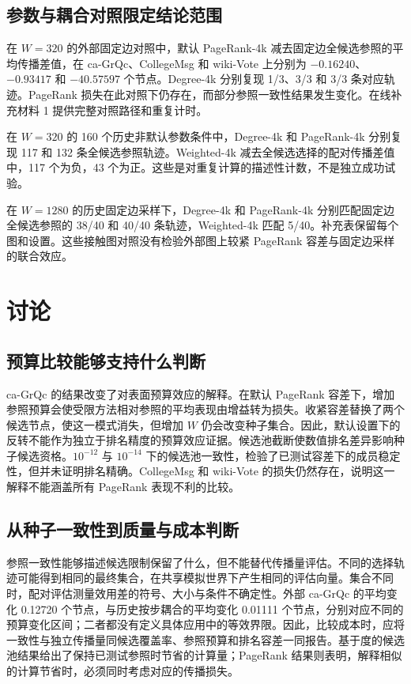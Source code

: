 \documentclass[smallextended]{svjour3}
\begin{document}
\subsection{参数与耦合对照限定结论范围}

在 $W=320$ 的外部固定边对照中，默认 PageRank-4k 减去固定边全候选参照的平均传播差值，在 ca-GrQc、CollegeMsg 和 wiki-Vote 上分别为 $-0.16240$、$-0.93417$ 和 $-40.57597$ 个节点。Degree-4k 分别复现 1/3、3/3 和 3/3 条对应轨迹。PageRank 损失在此对照下仍存在，而部分参照一致性结果发生变化。在线补充材料 1 提供完整对照路径和重复计时。

在 $W=320$ 的 160 个历史非默认参数条件中，Degree-4k 和 PageRank-4k 分别复现 117 和 132 条全候选参照轨迹。Weighted-4k 减去全候选选择的配对传播差值中，117 个为负，43 个为正。这些是对重复计算的描述性计数，不是独立成功试验。

在 $W=1280$ 的历史固定边采样下，Degree-4k 和 PageRank-4k 分别匹配固定边全候选参照的 38/40 和 40/40 条轨迹，Weighted-4k 匹配 5/40。补充表保留每个图和设置。这些接触图对照没有检验外部图上较紧 PageRank 容差与固定边采样的联合效应。
\FloatBarrier

\section{讨论}
\subsection{预算比较能够支持什么判断}
ca-GrQc 的结果改变了对表面预算效应的解释。在默认 PageRank 容差下，增加参照预算会使受限方法相对参照的平均表现由增益转为损失。收紧容差替换了两个候选节点，使这一模式消失，但增加 $W$ 仍会改变种子集合。因此，默认设置下的反转不能作为独立于排名精度的预算效应证据。候选池截断使数值排名差异影响种子候选资格。$10^{-12}$ 与 $10^{-14}$ 下的候选池一致性，检验了已测试容差下的成员稳定性，但并未证明排名精确。CollegeMsg 和 wiki-Vote 的损失仍然存在，说明这一解释不能涵盖所有 PageRank 表现不利的比较。

\subsection{从种子一致性到质量与成本判断}
参照一致性能够描述候选限制保留了什么，但不能替代传播量评估。不同的选择轨迹可能得到相同的最终集合，在共享模拟世界下产生相同的评估向量。集合不同时，配对评估测量效用差的符号、大小与条件不确定性。外部 ca-GrQc 的平均变化 0.12720 个节点，与历史按步耦合的平均变化 0.01111 个节点，分别对应不同的预算变化区间；二者都没有定义具体应用中的等效界限。因此，比较成本时，应将一致性与独立传播量同候选覆盖率、参照预算和排名容差一同报告。基于度的候选池结果给出了保持已测试参照时节省的计算量；PageRank 结果则表明，解释相似的计算节省时，必须同时考虑对应的传播损失。
\end{document}
